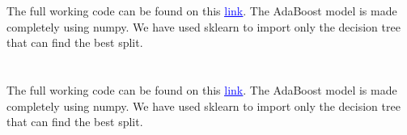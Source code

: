 \documentclass{homework}
\begin{document}
\section{}
The full working code can be found on this \href{https://github.com/Anshul-Sangrame/Handouts-2022-2023/blob/main/Boosting%20and%20bagging/code/Adaboost/main.ipynb}{\textcolor{blue}{\underline{link}}}. The AdaBoost model is made completely using numpy. We have used sklearn to import only the decision tree that can find the best split.

\section{}
The full working code can be found on this \href{https://github.com/Anshul-Sangrame/Handouts-2022-2023/blob/main/Boosting%20and%20bagging/code/Gradient%20boosting/main.ipynb}{\textcolor{blue}{\underline{link}}}. The AdaBoost model is made completely using numpy. We have used sklearn to import only the decision tree that can find the best split.

\end{document}
